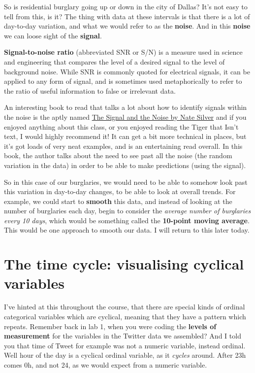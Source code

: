 \documentclass[
]{book}
\begin{document}
So is residential burglary going up or down in the city of Dallas? It's not easy to tell from this, is it? The thing with data at these intervals is that there is a lot of day-to-day variation, and what we would refer to as the \textbf{noise}. And in this \textbf{noise} we can loose sight of the \textbf{signal}.

\textbf{Signal-to-noise ratio} (abbreviated SNR or S/N) is a measure used in science and engineering that compares the level of a desired signal to the level of background noise. While SNR is commonly quoted for electrical signals, it can be applied to any form of signal, and is sometimes used metaphorically to refer to the ratio of useful information to false or irrelevant data.

An interesting book to read that talks a lot about how to identify signals within the noise is the aptly named \href{https://www.theguardian.com/books/2012/nov/09/signal-and-noise-nate-silver-review}{The Signal and the Noise by Nate Silver} and if you enjoyed anything about this class, or you enjoyed reading the Tiger that Isn't text, I would highly recommend it! It can get a bit more technical in places, but it's got loads of very neat examples, and is an entertaining read overall. In this book, the author talks about the need to see past all the noise (the random variation in the data) in order to be able to make predictions (using the signal).

So in this case of our burglaries, we would need to be able to somehow look past this variation in day-to-day changes, to be able to look at overall trends. For example, we could start to \textbf{smooth} this data, and instead of looking at the number of burglaries each day, begin to consider the \emph{average number of burglaries every 10 days}, which would be something called the \textbf{10-point moving average}. This would be one approach to smooth our data. I will return to this later today.

\hypertarget{the-time-cycle-visualising-cyclical-variables}{%
\section{The time cycle: visualising cyclical variables}\label{the-time-cycle-visualising-cyclical-variables}}

I've hinted at this throughout the course, that there are special kinds of ordinal categorical variables which are cyclical, meaning that they have a pattern which repeats. Remember back in lab 1, when you were coding the \textbf{levels of measurement} for the variables in the Twitter data we assembled? And I told you that time of Tweet for example was not a numeric variable, instead ordinal. Well hour of the day is a cyclical ordinal variable, as it \emph{cycles} around. After 23h comes 0h, and not 24, as we would expect from a numeric variable.
\end{document}
